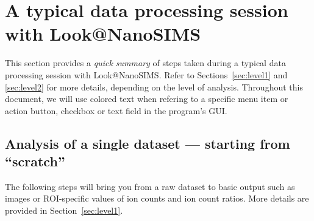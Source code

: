 \documentclass[a4paper, 11pt]{article}
\newcommand{\lans}[1]{{\color{magenta}#1}}
\newcommand{\lanscb}[1]{{\color{darkgreen}#1}}
\newcommand{\lanstf}[1]{{\color{cyan}#1}}
\newcounter{step}
\begin{document}
\clearpage

\section{A typical data processing session with Look@NanoSIMS}

This section provides a \emph{quick summary} of steps taken during a typical data processing session with Look@NanoSIMS. Refer to Sections~\ref{sec:level1} and \ref{sec:level2} for more details, depending on the level of analysis. Throughout this document, we will use colored text when refering to a specific \lans{menu item or action button}, \lanscb{checkbox} or \lanstf{text field} in the program's GUI.


\subsection{Analysis of a single dataset --- starting from ``scratch''}
\label{sec:analysis_from_scratch}

The following steps will bring you from a raw dataset to basic output such as images or ROI-specific values of ion counts and ion count ratios. More details are provided in Section~\ref{sec:level1}.
\end{document}
